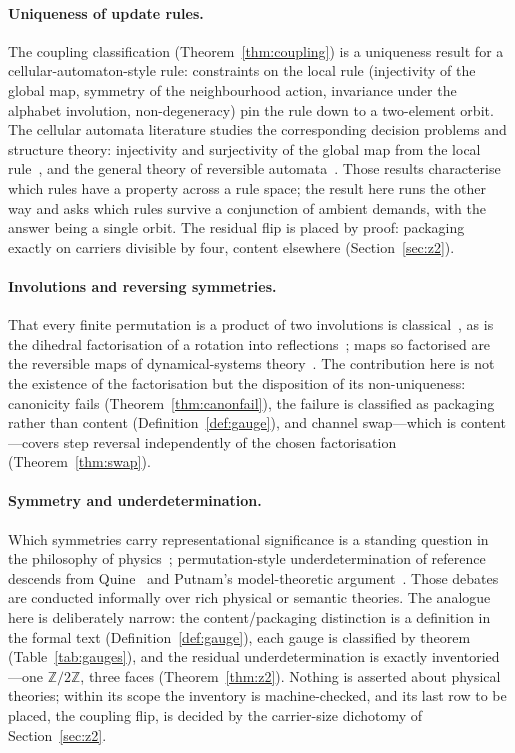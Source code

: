\documentclass[11pt,a4paper]{article}
\theoremstyle{plain}
\theoremstyle{definition}
\theoremstyle{remark}
\newcommand{\Ztwo}{\mathbb{Z}/2\mathbb{Z}}
\begin{document}
\paragraph{Uniqueness of update rules.}
The coupling classification (Theorem~\ref{thm:coupling}) is a
uniqueness result for a cellular-automaton-style rule: constraints on
the local rule (injectivity of the global map, symmetry of the
neighbourhood action, invariance under the alphabet involution,
non-degeneracy) pin the rule down to a two-element orbit. The
cellular automata literature studies the corresponding decision
problems and structure theory: injectivity and surjectivity of the
global map from the local rule~\cite{amorosopatt}, and the general
theory of reversible automata~\cite{kari,toffolimargolus}. Those
results characterise which rules have a property across a rule space;
the result here runs the other way and asks which rules survive a
conjunction of ambient demands, with the answer being a single orbit.
The residual flip is placed by proof: packaging exactly on carriers
divisible by four, content elsewhere (Section~\ref{sec:z2}).

\paragraph{Involutions and reversing symmetries.}
That every finite permutation is a product of two involutions is
classical~\cite{petersentenner}, as is the dihedral factorisation of a
rotation into reflections~\cite{dihedral}; maps so factorised are the
reversible maps of dynamical-systems theory~\cite{lambroberts}. The
contribution here is not the existence of the factorisation but the
disposition of its non-uniqueness: canonicity fails
(Theorem~\ref{thm:canonfail}), the failure is classified as packaging
rather than content (Definition~\ref{def:gauge}), and channel
swap---which is content---covers step reversal independently of the
chosen factorisation (Theorem~\ref{thm:swap}).

\paragraph{Symmetry and underdetermination.}
Which symmetries carry representational significance is a standing
question in the philosophy of physics~\cite{bradingcastellani,dewar};
permutation-style underdetermination of reference descends from
Quine~\cite{quine} and Putnam's model-theoretic argument~\cite{putnam}.
Those debates are conducted informally over rich physical or semantic
theories. The analogue here is deliberately narrow: the
content/packaging distinction is a definition in the formal text
(Definition~\ref{def:gauge}), each gauge is classified by theorem
(Table~\ref{tab:gauges}), and the residual underdetermination is
exactly inventoried---one $\Ztwo$, three faces (Theorem~\ref{thm:z2}).
Nothing is asserted about physical theories; within its scope the
inventory is machine-checked, and its last row to be placed, the
coupling flip, is decided by the carrier-size dichotomy of
Section~\ref{sec:z2}.
\end{document}
